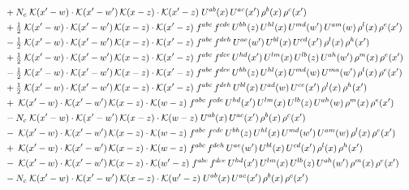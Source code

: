 \documentclass[9pt]{article}
\begin{document}
\begin{align}
&\quad +N_c\;\mathcal{K}(x'-w)\cdot\mathcal{K}(x'-w')\,\mathcal{K}(x-z)\cdot\mathcal{K}(x'-z)\;U^{ab}(x)\,U^{ac}(x')\,\rho^{b}(x)\,\rho^{c}(x')\notag\\
&\quad +\tfrac{1}{2}\;\mathcal{K}(x'-w)\cdot\mathcal{K}(x'-w')\,\mathcal{K}(x-z)\cdot\mathcal{K}(x'-z)\;f^{abc}\,f^{cde}\,U^{bh}(z)\,U^{hl}(x)\,U^{md}(w')\,U^{am}(w)\,\rho^{l}(x)\,\rho^{e}(x')\notag\\
&\quad -\tfrac{1}{2}\;\mathcal{K}(x'-w)\cdot\mathcal{K}(x'-w')\,\mathcal{K}(x-z)\cdot\mathcal{K}(x'-z)\;f^{abc}\,f^{deh}\,U^{ae}(w')\,U^{bl}(x)\,U^{cd}(x')\,\rho^{l}(x)\,\rho^{h}(x')\notag\\
&\quad +\tfrac{1}{2}\;\mathcal{K}(x'-w)\cdot\mathcal{K}(x'-w')\,\mathcal{K}(x-z)\cdot\mathcal{K}(x'-z)\;f^{abc}\,f^{dce}\,U^{hd}(x')\,U^{lm}(x)\,U^{lb}(z)\,U^{ah}(w')\,\rho^{m}(x)\,\rho^{e}(x')\notag\\
&\quad -\tfrac{1}{2}\;\mathcal{K}(x'-w)\cdot\mathcal{K}(x'-w')\,\mathcal{K}(x-z)\cdot\mathcal{K}(x'-z)\;f^{abc}\,f^{dce}\,U^{bh}(z)\,U^{hl}(x)\,U^{md}(w)\,U^{ma}(w')\,\rho^{l}(x)\,\rho^{e}(x')\notag\\
&\quad +\tfrac{1}{2}\;\mathcal{K}(x'-w)\cdot\mathcal{K}(x'-w')\,\mathcal{K}(x-z)\cdot\mathcal{K}(x'-z)\;f^{abc}\,f^{deh}\,U^{bl}(x)\,U^{ad}(w)\,U^{ce}(x')\,\rho^{l}(x)\,\rho^{h}(x')\notag\\
&\quad +\;\mathcal{K}(x'-w)\cdot\mathcal{K}(x'-w')\,\mathcal{K}(x-z)\cdot\mathcal{K}(w-z)\;f^{abc}\,f^{cde}\,U^{hd}(x')\,U^{lm}(x)\,U^{lb}(z)\,U^{ah}(w)\,\rho^{m}(x)\,\rho^{e}(x')\notag\\
&\quad -N_c\;\mathcal{K}(x'-w)\cdot\mathcal{K}(x'-w')\,\mathcal{K}(x-z)\cdot\mathcal{K}(w-z)\;U^{ab}(x)\,U^{ac}(x')\,\rho^{b}(x)\,\rho^{c}(x')\notag\\
&\quad -\;\mathcal{K}(x'-w)\cdot\mathcal{K}(x'-w')\,\mathcal{K}(x-z)\cdot\mathcal{K}(w-z)\;f^{abc}\,f^{cde}\,U^{bh}(z)\,U^{hl}(x)\,U^{md}(w')\,U^{am}(w)\,\rho^{l}(x)\,\rho^{e}(x')\notag\\
&\quad +\;\mathcal{K}(x'-w)\cdot\mathcal{K}(x'-w')\,\mathcal{K}(x-z)\cdot\mathcal{K}(w-z)\;f^{abc}\,f^{deh}\,U^{ae}(w')\,U^{bl}(x)\,U^{cd}(x')\,\rho^{l}(x)\,\rho^{h}(x')\notag\\
&\quad -\;\mathcal{K}(x'-w)\cdot\mathcal{K}(x'-w')\,\mathcal{K}(x-z)\cdot\mathcal{K}(w'-z)\;f^{abc}\,f^{dce}\,U^{hd}(x')\,U^{lm}(x)\,U^{lb}(z)\,U^{ah}(w')\,\rho^{m}(x)\,\rho^{e}(x')\notag\\
&\quad -N_c\;\mathcal{K}(x'-w)\cdot\mathcal{K}(x'-w')\,\mathcal{K}(x-z)\cdot\mathcal{K}(w'-z)\;U^{ab}(x)\,U^{ac}(x')\,\rho^{b}(x)\,\rho^{c}(x')\notag\\

\end{align}
\end{document}
